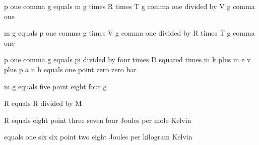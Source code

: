 p one comma g equals m g times R times T g comma one divided by V g comma one

m g equals p one comma g times V g comma one divided by R times T g comma one

p one comma g equals pi divided by four times D squared times m k plus m e v plus p a n b equals one point zero zero bar

m g equals five point eight four g

R equals R divided by M

R equals eight point three seven four Joules per mole Kelvin

equals one six six point two eight Joules per kilogram Kelvin